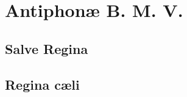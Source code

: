 \documentclass[initial=ZallmanCaps,staff=19,font=greciliae,11pt,a4paper,openany,twoside,choralsign=PfefferMediaeval]{gregorian}
\begin{document}
\chapter{Antiphonæ B. M. V.}
\def\gebet{\textsc{Marienantiphonen}}
\section*{Salve Regina}\par
{}
\newpage
\section*{Regina cæli}\par
{}
\par
\begin{center}
{\centering{\scalebox{3}{\grecross}}}
\end{center}
\end{document}
